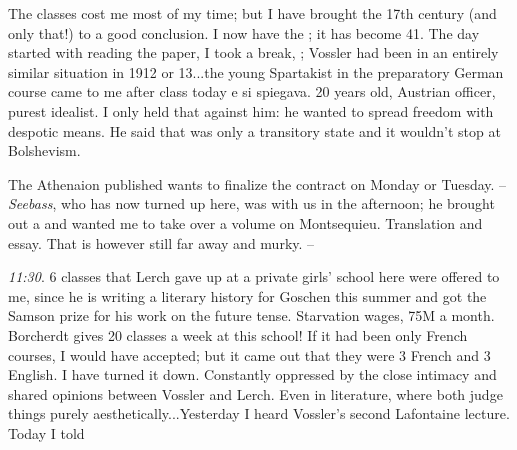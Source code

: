 
The classes cost me most of my time; but I have brought the 17th century (and only that!) to a good conclusion. I now have the ; it has become 41. The day started with reading the paper, I took a break, ; Vossler had been in an entirely similar situation in 1912 or 13...the young Spartakist in the preparatory German course came to me after class today e si spiegava. 20 years old, Austrian officer, purest idealist. I only held that against him: he wanted to spread freedom with despotic means. He said that was only a transitory state and it wouldn't stop at Bolshevism.

The Athenaion published wants to finalize the contract on Monday or Tuesday. -- \textit{Seebass}, who has now turned up here, was with us in the afternoon; he brought out a  and wanted me to take over a volume on Montsequieu. Translation and essay. That is however still far away and murky. --

\textit{11:30}. 6 classes that Lerch gave up at a private girls' school here were offered to me, since he is writing a literary history for Goschen this summer and got the Samson prize for his work on the future tense. Starvation wages, 75M a month. Borcherdt gives 20 classes a week at this school! If it had been only French courses, I would have accepted; but it came out that they were 3 French and 3 English. I have turned it down. Constantly oppressed by the close intimacy and shared opinions between Vossler and Lerch. Even in literature, where both judge things purely aesthetically...Yesterday I heard Vossler's second Lafontaine lecture. Today I told 

